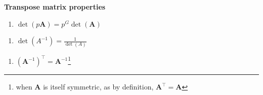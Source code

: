 \hypertarget{properties-matrix}{}
\begin{blackbox}{\textbf{Transpose matrix properties}}

\begin{cols}

\begin{col}{0.3\textwidth}

\begin{enumerate}
\def\labelenumi{\alph{enumi}.}
\tightlist
\item
  \(\operatorname{det}(p\boldsymbol{A})=p^G \operatorname{det} (\boldsymbol{A})\)
\end{enumerate}

\end{col}

\begin{col}{0.3\textwidth}

\begin{enumerate}
\def\labelenumi{\alph{enumi}.}
\setcounter{enumi}{1}
\tightlist
\item
  \(\operatorname{det}(A^{-1})=\frac{1}{\operatorname{det}(A)}\)
\end{enumerate}

\end{col}

\begin{col}{0.3\textwidth}

\begin{enumerate}
\def\labelenumi{\alph{enumi}.}
\setcounter{enumi}{2}
\tightlist
\item
  \(\left(\boldsymbol{A}^{-1} \right)^\top=\boldsymbol{A}^{-1}\)\footnote{when \(\boldsymbol{A}\) is itself symmetric, as by definition,
    \(\boldsymbol{A}^\top=\boldsymbol{A}\)}
\end{enumerate}

\end{col}

\end{cols}

\end{blackbox}

